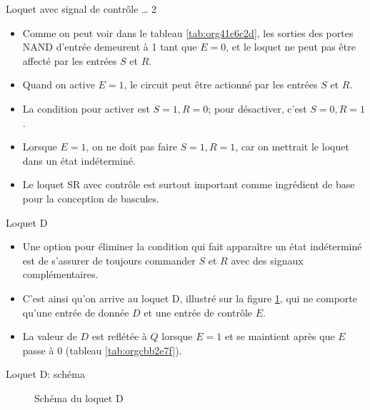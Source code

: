 \documentclass[presentation]{beamer}
\begin{document}
\begin{frame}[label={sec:org5ec4c89}]{Loquet avec signal de contrôle \ldots{} 2}
\begin{itemize}
\item Comme on peut voir dans le tableau \ref{tab:org41c6c2d}, les sorties des portes NAND d'entrée demeurent à 1 tant que \(E = 0\), et le loquet ne peut pas être affecté par les entrées \(S\) et \(R\).

\item Quand on active \(E = 1\), le circuit peut être actionné par les entrées \(S\) et \(R\).

\item La condition pour activer est \(S=1, R=0\); pour désactiver, c'est \(S=0, R=1\).

\item Lorsque \(E = 1\), on ne doit pas faire \(S=1, R=1\), car on mettrait le loquet dans un état indéterminé.

\item Le loquet SR avec contrôle est surtout important comme ingrédient de base pour la conception de bascules.
\end{itemize}
\end{frame}

\begin{frame}[label={sec:orgefbd68c}]{Loquet D}
\begin{itemize}
\item Une option pour éliminer la condition qui fait apparaître un état indéterminé est de s'assurer de toujours commander \(S\) et \(R\) avec des signaux complémentaires.

\item C'est ainsi qu'on arrive au loquet D, illustré sur la figure \ref{fig:orgc6efca4}, qui ne comporte qu'une entrée de donnée \(D\) et une entrée de contrôle \(E\).

\item La valeur de \(D\) est reflétée à \(Q\) lorsque \(E=1\) et se maintient après que \(E\) passe à 0 (tableau \ref{tab:orgcbb2e7f}).
\end{itemize}
\end{frame}

\begin{frame}[label={sec:orga1bdd94}]{Loquet D: schéma}
\begin{figure}[htbp]
\centering

\caption{\label{fig:orgc6efca4}Schéma du loquet D}
\end{figure}
\end{frame}
\end{document}
